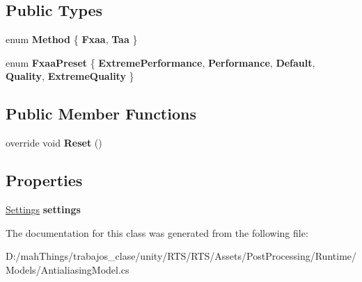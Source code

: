 \subsection*{Public Types}
\begin{DoxyCompactItemize}
\item 
\mbox{\label{class_unity_engine_1_1_post_processing_1_1_antialiasing_model_ab5cf39cfa77f367f530971a77518e89f}} 
enum {\bfseries Method} \{ {\bfseries Fxaa}, 
{\bfseries Taa}
 \}
\item 
\mbox{\label{class_unity_engine_1_1_post_processing_1_1_antialiasing_model_a8fa1e784663b26f942fb5558e3328bc4}} 
enum {\bfseries Fxaa\+Preset} \{ \newline
{\bfseries Extreme\+Performance}, 
{\bfseries Performance}, 
{\bfseries Default}, 
{\bfseries Quality}, 
\newline
{\bfseries Extreme\+Quality}
 \}
\end{DoxyCompactItemize}
\subsection*{Public Member Functions}
\begin{DoxyCompactItemize}
\item 
\mbox{\label{class_unity_engine_1_1_post_processing_1_1_antialiasing_model_aeed2830b0c1b3a6ef09c0aea26b0b206}} 
override void {\bfseries Reset} ()
\end{DoxyCompactItemize}
\subsection*{Properties}
\begin{DoxyCompactItemize}
\item 
\mbox{\label{class_unity_engine_1_1_post_processing_1_1_antialiasing_model_af1ad76b667f86a55a3db817f6ebfdbe9}} 
\mbox{\hyperlink{struct_unity_engine_1_1_post_processing_1_1_antialiasing_model_1_1_settings}{Settings}} {\bfseries settings}
\end{DoxyCompactItemize}


The documentation for this class was generated from the following file\+:\begin{DoxyCompactItemize}
\item 
D\+:/mah\+Things/trabajos\+\_\+clase/unity/\+R\+T\+S/\+R\+T\+S/\+Assets/\+Post\+Processing/\+Runtime/\+Models/Antialiasing\+Model.\+cs\end{DoxyCompactItemize}
